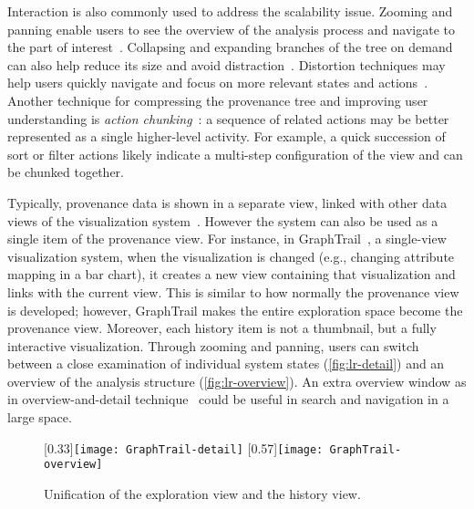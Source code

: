 Interaction is also commonly used to address the scalability issue. Zooming and panning enable users to see the overview of the analysis process and navigate to the part of interest~\cite{Dunne2012}. Collapsing and expanding branches of the tree on demand can also help reduce its size and avoid distraction~\cite{Bavoil2005}. Distortion techniques may help users quickly navigate and focus on more relevant states and actions~\cite{Meng1998}. Another technique for compressing the provenance tree and improving user understanding is \emph{action chunking}~\cite{Heer2008}: a sequence of related actions may be better represented as a single higher-level activity. For example, a quick succession of sort or filter actions likely indicate a multi-step configuration of the view and can be chunked together.

Typically, provenance data is shown in a separate view, linked with other data views of the visualization system~\cite{Shrinivasan2008,Heer2008,Pike2009,Kadivar2009}. However the system can also be used as a single item of the provenance view. For instance, in GraphTrail~\cite{Dunne2012}, a single-view visualization system, when the visualization is changed (e.g., changing attribute mapping in a bar chart), it creates a new view containing that visualization and links with the current view. This is similar to how normally the provenance view is developed; however, GraphTrail makes the entire exploration space become the provenance view. Moreover, each history item is not a thumbnail, but a fully interactive visualization. Through zooming and panning, users can switch between a close examination of individual system states (\autoref{fig:lr-detail}) and an overview of the analysis structure (\autoref{fig:lr-overview}). An extra overview window as in overview-and-detail technique~\cite{Cockburn2008} could be useful in search and navigation in a large space.

\begin{figure}
\centering
{}[0.33\columnwidth]{\texttt{[image: GraphTrail-detail]}}
\hfill
{}[0.57\columnwidth]{\texttt{[image: GraphTrail-overview]}}
\caption[Unification of the exploration view and the history view]{Unification of the exploration view and the history view. }
\end{figure}

